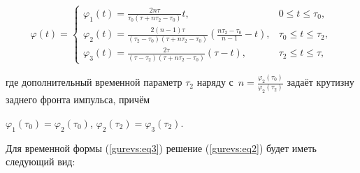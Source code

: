 \begin{equation}

\label{gurevs:eq6}

\varphi (t) = \left\{ {\begin{array}{ll}

 \varphi _1 (t) = \frac{2n\tau }{\tau _0 \left( {\tau + n\tau _2 - \tau _0 } 

\right)}t, &

0 \leqslant t \leqslant \tau _0, \\ 

 \varphi _2 (t) = \frac{2\left( {n - 1} \right)\tau }{\left( {\tau _2 - \tau 

_0 } \right)\left( {\tau + n\tau _2 - \tau _0 } \right)}\left( {\frac{n\tau 

_2 - \tau _0 }{n - 1} - t} \right),

&

\tau _0 \leqslant t \leqslant \tau _2, \\ 

 \varphi _3 (t) = \frac{2\tau }{\left( {\tau - \tau _2 } \right)\left( {\tau 

+ n\tau _2 - \tau _0 } \right)}\left( {\tau - t} \right),&

\tau _2 \leqslant t \leqslant \tau,

 \end{array}} \right.

\end{equation}

где дополнительный временной параметр $\tau _{2}$ наряду с~$n = \frac{\varphi _2 (\tau _0 ) }{ \varphi _2 (\tau _2 )}$ задаёт крутизну заднего фронта импульса, причём

$\varphi _1 (\tau _0 ) = \varphi _2 (\tau _0 )$, $\varphi _2 (\tau _2 ) = \varphi _3 (\tau _2 )$.



Для временной формы (\ref{gurevs:eq3}) решение (\ref{gurevs:eq2}) будет иметь следующий вид:

